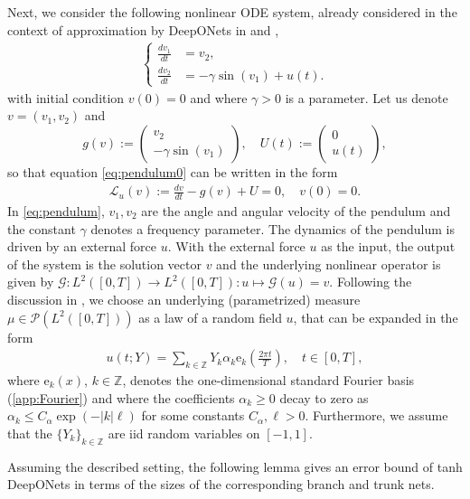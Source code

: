 \documentclass{article}
\numberwithin{equation}{section}
\newcommand{\fb}{\bm{\mathrm{e}}}
\newcommand{\Z}{\mathbb{Z}}
\newcommand{\G}{\mathcal{G}}
\newcommand{\cG}{\mathcal{G}}
\newcommand{\cL}{\mathcal{L}}
\newcommand{\cP}{\mathcal{P}}
\newcommand{\1}{\mathbbm{1}}
\begin{document}
Next, we consider the following nonlinear ODE system, already considered in the context of approximation by DeepONets in \cite{deeponets} and \cite{LMK1},
\begin{gather} \label{eq:pendulum0}
\left\{
\begin{aligned}
\frac{dv_1}{dt} &= v_2,
\\
\frac{dv_2}{dt} &= -\gamma\sin(v_1) + u(t).
\end{aligned}
\right.
\end{gather}
with  initial condition $v(0) = 0$ and where $\gamma>0$ is a parameter. Let us denote $v = (v_1, v_2)$ and
\begin{equation}
    g(v) := 
\begin{pmatrix}
v_2 \\
-\gamma\sin(v_1)
\end{pmatrix},
\quad
U(t) := 
\begin{pmatrix}
0 \\
u(t)
\end{pmatrix},
\end{equation}
so that equation \eqref{eq:pendulum0} can be written in the form
\begin{align} \label{eq:pendulum}
\cL_u(v) := \frac{dv}{dt} - g(v) + U = 0, \quad v(0) = 0.
\end{align}
In \eqref{eq:pendulum}, $v_1,v_2$ are the angle and angular velocity of the pendulum and the constant $\gamma$
denotes a frequency parameter. The dynamics of the pendulum is driven by an external force $u$. 
With the external force $u$ as the input, the output of the system is the solution vector $v$ and the underlying nonlinear operator is given by $\G: L^2([0,T]) \to L^2([0,T]): u \mapsto \cG(u) = v$. Following the discussion in \cite{LMK1}, we choose an underlying (parametrized) measure $\mu \in \cP(L^2([0,T]))$ as a law of a random field $u$, that can be expanded in the form 
\begin{align} \label{eq:pendulum-law}
u(t; Y) 
=
\sum_{k\in \Z} Y_k \alpha_k \fb_k\left(\frac{2\pi t}{T}\right),
\quad
t \in [0,T],
\end{align}
where $\fb_k(x)$, $k\in \Z$, denotes the one-dimensional standard Fourier basis (\ref{app:Fourier}) and where the coefficients $\alpha_k\ge 0$ decay to zero as
$\alpha_k \le C_\alpha \exp(-|k|\ell)$ for some constants $C_\alpha, \ell>0$. 
Furthermore, we assume that the $\{Y_k\}_{k\in \Z}$ are iid random variables on $[-1,1]$.

Assuming the described setting, the following lemma gives an error bound of tanh DeepONets in terms of the sizes of the corresponding branch and trunk nets. 
\end{document}
